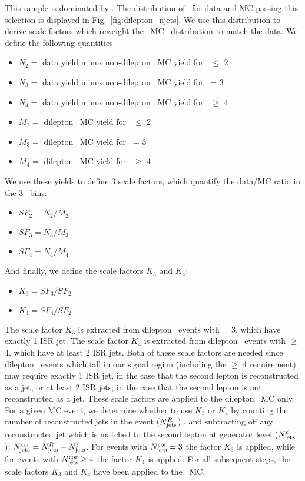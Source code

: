 This sample is dominated by \ttll. The distribution of \njets\ for data and MC passing this selection is displayed in Fig.~\ref{fig:dilepton_njets}. 
We use this distribution to derive scale factors which reweight the \ttll\ MC \njets\ distribution to match the data. We define the following
quantities

\begin{itemize}
\item $N_{2}=$ data yield minus non-dilepton \ttbar\ MC yield for \njets\ $\leq$ 2
\item $N_{3}=$ data yield minus non-dilepton \ttbar\ MC yield for \njets\ = 3
\item $N_{4}=$ data yield minus non-dilepton \ttbar\ MC yield for \njets\ $\geq$ 4
\item $M_{2}=$ dilepton \ttbar\ MC yield for \njets\ $\leq$ 2
\item $M_{3}=$ dilepton \ttbar\ MC yield for \njets\ = 3
\item $M_{4}=$ dilepton \ttbar\ MC yield for \njets\ $\geq$ 4
\end{itemize}

We use these yields to define 3 scale factors, which quantify the data/MC ratio in the 3 \njets\ bins:

\begin{itemize}
\item $SF_2 = N_2 / M_2$
\item $SF_3 = N_3 / M_3$
\item $SF_4 = N_4 / M_4$
\end{itemize}

And finally, we define the scale factors $K_3$ and $K_4$:

\begin{itemize}
\item $K_3 = SF_3 / SF_2$
\item $K_4 = SF_4 / SF_2$
\end{itemize}

The scale factor $K_3$ is extracted from dilepton \ttbar\ events with \njets = 3, which have exactly 1 ISR jet.
The scale factor $K_4$ is extracted from dilepton \ttbar\ events with \njets $\geq$ 4, which have at least 2 ISR jets.
Both of these scale factors are needed since dilepton \ttbar\ events which fall in our signal region (including
the \njets $\geq$ 4 requirement) may require exactly 1 ISR jet, in the case that the second lepton is reconstructed
as a jet, or at least 2 ISR jets, in the case that the second lepton is not reconstructed as a jet. These scale
factors are applied to the dilepton \ttbar\ MC only. For a given MC event, we determine whether to use $K_3$ or $K_4$
by counting the number of reconstructed jets in the event ($N_{\rm{jets}}^R$) , and subtracting off any reconstructed 
jet which is matched to the second lepton at generator level ($N_{\rm{jets}}^\ell$); $N_{\rm{jets}}^{\rm{cor}} = N_{\rm{jets}}^R - N_{\rm{jets}}^\ell$.
For events with $N_{\rm{jets}}^{\rm{cor}}=3$ the factor $K_3$ is applied, while for events with $N_{\rm{jets}}^{\rm{cor}}\geq4$ the factor $K_4$ is applied.
For all subsequent steps, the scale factors $K_3$ and $K_4$ have been applied to the \ttll\ MC.
 
